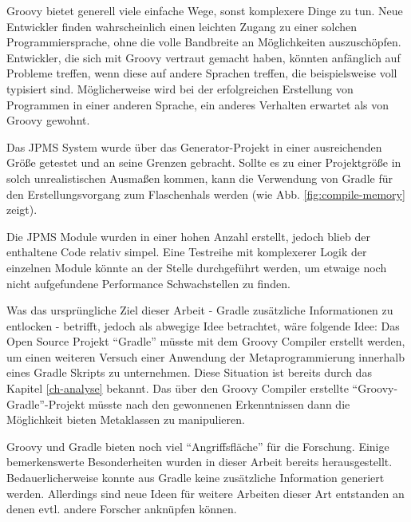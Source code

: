 Groovy bietet generell viele einfache Wege, sonst komplexere Dinge zu tun. 
Neue Entwickler finden wahrscheinlich einen leichten Zugang zu einer solchen Programmiersprache, ohne die volle Bandbreite an Möglichkeiten auszuschöpfen.
Entwickler, die sich mit Groovy vertraut gemacht haben, könnten anfänglich auf Probleme treffen, wenn diese auf andere Sprachen treffen, die beispielsweise voll typisiert sind.
Möglicherweise wird bei der erfolgreichen Erstellung von Programmen in einer anderen Sprache, ein anderes Verhalten erwartet als von Groovy gewohnt.

Das JPMS System wurde über das Generator-Projekt in einer ausreichenden Größe getestet und an seine Grenzen gebracht. 
Sollte es zu einer Projektgröße in solch unrealistischen Ausmaßen kommen, kann die Verwendung von Gradle für den Erstellungsvorgang zum Flaschenhals werden (wie Abb. \ref{fig:compile-memory} zeigt).

Die JPMS Module wurden in einer hohen Anzahl erstellt, jedoch blieb der enthaltene Code relativ simpel.
Eine Testreihe mit komplexerer Logik der einzelnen Module könnte an der Stelle durchgeführt werden, um etwaige noch nicht aufgefundene Performance Schwachstellen zu finden.

Was das ursprüngliche Ziel dieser Arbeit - Gradle zusätzliche Informationen zu entlocken - betrifft, jedoch als abwegige Idee betrachtet, wäre folgende Idee:
Das Open Source Projekt \enquote{Gradle} müsste mit dem Groovy Compiler erstellt werden, um einen weiteren Versuch einer Anwendung der Metaprogrammierung innerhalb eines Gradle Skripts zu unternehmen.
Diese Situation ist bereits durch das Kapitel \ref{ch-analyse} bekannt. 
Das über den Groovy Compiler erstellte \enquote{Groovy-Gradle}-Projekt müsste nach den gewonnenen Erkenntnissen dann die Möglichkeit bieten Metaklassen zu manipulieren.

Groovy und Gradle bieten noch viel \enquote{Angriffsfläche} für die Forschung. 
Einige bemerkenswerte Besonderheiten wurden in dieser Arbeit bereits herausgestellt.
Bedauerlicherweise konnte aus Gradle keine zusätzliche Information generiert werden. 
Allerdings sind neue Ideen für weitere Arbeiten dieser Art entstanden an denen evtl. andere Forscher anknüpfen können.